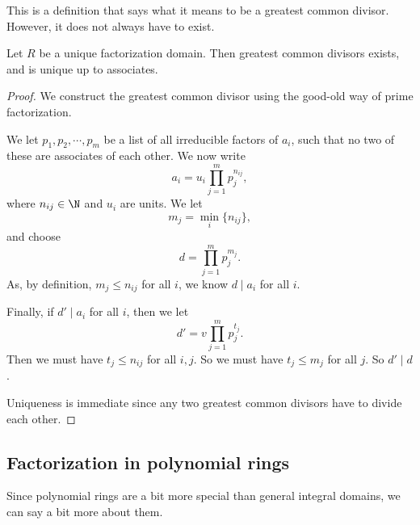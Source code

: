 \documentclass[a4paper]{article}
\begin{document}
This is a definition that says what it means to be a greatest common divisor. However, it does not always have to exist.
\begin{lemma}
  Let $R$ be a unique factorization domain. Then greatest common divisors exists, and is unique up to associates.
\end{lemma}

\begin{proof}
  We construct the greatest common divisor using the good-old way of prime factorization.

  We let $p_1, p_2, \cdots, p_m$ be a list of all irreducible factors of $a_i$, such that no two of these are associates of each other. We now write
  \[
    a_i = u_i\prod_{j = 1}^m p_j^{n_{ij}},
  \]
  where $n_{ij} \in \N$ and $u_i$ are units. We let
  \[
    m_j = \min_i \{n_{ij}\},
  \]
  and choose
  \[
    d = \prod_{j = 1}^m p_j^{m_j}.
  \]
  As, by definition, $m_j \leq n_{ij}$ for all $i$, we know $d \mid a_i$ for all $i$.

  Finally, if $d' \mid a_i$ for all $i$, then we let
  \[
    d' = v \prod_{j = 1}^m p_j^{t_j}.
  \]
  Then we must have $t_j \leq n_{ij}$ for all $i, j$. So we must have $t_j \leq m_j$ for all $j$. So $d' \mid d$.

  Uniqueness is immediate since any two greatest common divisors have to divide each other.
\end{proof}

\subsection{Factorization in polynomial rings}
Since polynomial rings are a bit more special than general integral domains, we can say a bit more about them.
\end{document}
